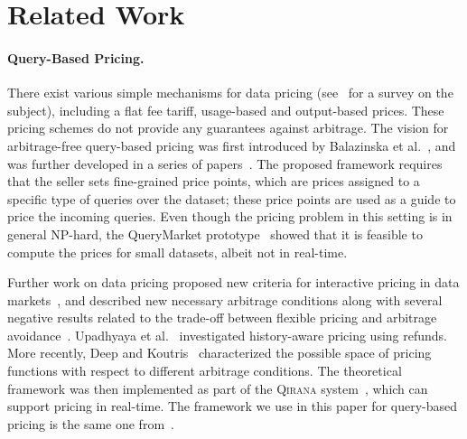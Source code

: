 \section{Related Work}
\label{sec:related}


\paragraph{Query-Based Pricing.}
There exist various simple mechanisms for data pricing (see~\cite{muschalle2012pricing} for a survey on the subject), including a flat fee tariff, usage-based and output-based prices. 
These pricing schemes do not provide any guarantees against arbitrage.
%
The vision for arbitrage-free query-based pricing was first introduced by Balazinska et al.~\cite{balazinska:11b}, and was further developed in a series of papers~\cite{KUBHS12,KUBHS13,KUBHS12b}. The proposed framework requires that the seller sets fine-grained price points, which are prices assigned to a specific type of queries
over the dataset; these price points are used as a guide to price the incoming queries. 
Even though the pricing problem in this setting is in general NP-hard, the QueryMarket prototype~\cite{KUBHS13} showed that it is feasible to compute the prices for small datasets, albeit not in real-time. 


Further work on data pricing proposed new criteria for interactive pricing in data markets~\cite{LM12}, and described new necessary arbitrage conditions along with several negative results related to the trade-off between flexible pricing and arbitrage avoidance~\cite{LK14}. Upadhyaya et al.~\cite{Upadhyaya2016} investigated history-aware pricing using refunds. More recently, Deep and Koutris~\cite{deep2016design} characterized the possible space of pricing functions with respect to different arbitrage conditions. The theoretical framework was then implemented as part of the \textsc{Qirana} system~\cite{deep2017qirana}, which can support pricing in real-time. The framework we use in this paper for query-based pricing is the same one from~\cite{deep2017qirana}. 


